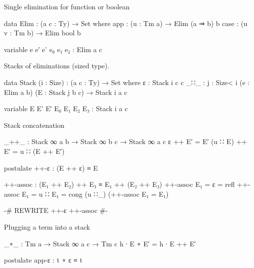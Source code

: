   Single elimination for function or boolean

\begin{code}
  data Elim : (a c : Ty) → Set where
    app   : (u : Tm a)    → Elim (a ⇒ b)  b
    case  : (u v : Tm b)  → Elim bool     b

  variable e e′ e' e₀ e₁ e₂ : Elim a c
\end{code}

  Stacks of eliminations (sized type).

\begin{code}
  data Stack (i : Size) : (a c : Ty) → Set where
    ε    : Stack i c c
    _∷_  : {j : Size< i} (e : Elim a b) (E : Stack j b c) → Stack i a c
\end{code}


\begin{code}
  variable E E' E′ E₀ E₁ E₂ E₃ : Stack i a c
\end{code}

Stack concatenation

\begin{code}
_++_ : Stack ∞ a b → Stack ∞ b c → Stack ∞ a c
ε        ++ E′ = E′
(u ∷ E)  ++ E′ = u ∷ (E ++ E′)

postulate
  ++-ε : (E ++ ε) ≡ E
\end{code}


\begin{code}
++-assoc : (E₁ ++ E₂) ++ E₃ ≡ E₁ ++ (E₂ ++ E₃)
++-assoc {E₁ = ε}       = refl
++-assoc {E₁ = u ∷ E₁}  = cong (u ∷_) (++-assoc {E₁ = E₁})

{-# REWRITE ++-ε ++-assoc #-}
\end{code}

Plugging a term into a stack

\begin{code}
_∘_ : Tm a → Stack ∞ a c → Tm c
h ∙ E ∘ E′ = h ∙ E ++ E′

postulate
  app-ε : t ∘ ε ≡ t
\end{code}


